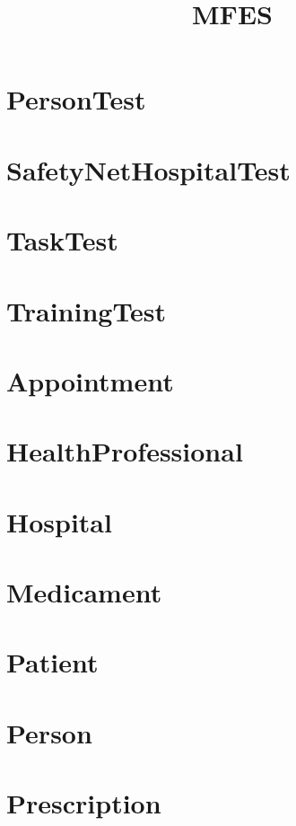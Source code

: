 \documentclass{article}
\begin{document}
\title{MFES}
\author{}
\maketitle
\tableofcontents

\section{PersonTest}

\section{SafetyNetHospitalTest}

\section{TaskTest}

\section{TrainingTest}

\section{Appointment}

\section{HealthProfessional}

\section{Hospital}

\section{Medicament}

\section{Patient}

\section{Person}

\section{Prescription}

\end{document}
